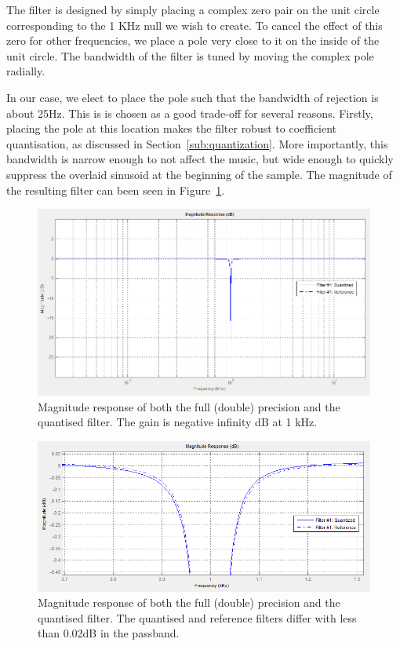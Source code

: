 \documentclass[]{article}
\begin{document}
The filter is designed by simply placing a complex zero pair on the unit circle corresponding to the 1 KHz null we wish to create. To cancel the effect of this zero for other frequencies, we place a pole very close to it on the inside of the unit circle. The bandwidth of the filter is tuned by moving the complex pole radially.

In our case, we elect to place the pole such that the bandwidth of rejection is about 25Hz. This is is chosen as a good trade-off for several reasons. Firstly, placing the pole at this location makes the filter robust to coefficient quantisation, as discussed in Section~\ref{sub:quantization}.
More importantly, this bandwidth is narrow enough to not affect the music, but wide enough to quickly suppress the overlaid sinusoid at the beginning of the sample.
The magnitude of the resulting filter can been seen in Figure~\ref{fig:matlabmagnitudelog}.

\begin{figure}[htbp]
	\begin{center}
		\includegraphics[width = \textwidth]{matlabmagnitudelog.PNG}
	\end{center}
	\caption{Magnitude response of both the full (double) precision and the quantised filter. The gain is negative infinity dB at 1 kHz.}
	\label{fig:matlabmagnitudelog}
\end{figure}

\begin{figure}[htbp]
	\begin{center}
		\includegraphics[width = \textwidth]{matlabmagnitude2.PNG}
	\end{center}
	\caption{Magnitude response of both the full (double) precision and the quantised filter. The quantised and reference filters differ with less than 0.02dB in the passband.}
	\label{fig:matlabmagnitudezoom}
\end{figure}
\end{document}
